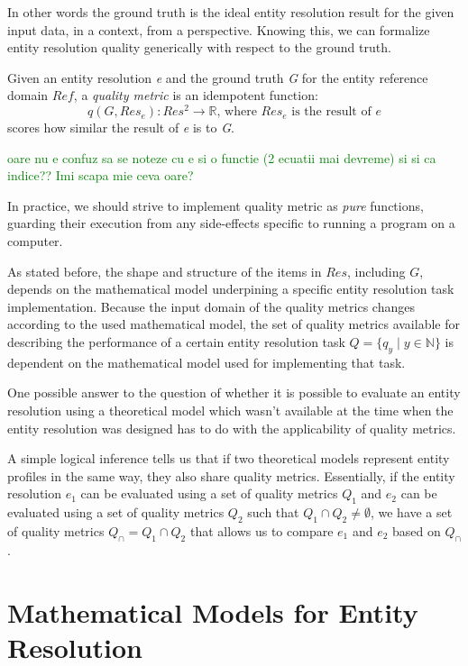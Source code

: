 \documentclass[journal]{IEEEtran}
\begin{document}
    In other words the ground truth is the ideal entity resolution result for 
    the given input data, in a context, from a perspective.
    Knowing this, we can formalize entity resolution quality generically with
    respect to the ground truth.
    
    \begin{defn}
    Given an entity resolution \textit{e} and the ground truth \textit{G} for
    the entity reference domain $Ref$, a \textit{quality metric} is an
    idempotent function:
    \[
        q(G, Res_e): Res^2 \rightarrow \mathbb{R}\textrm{, where
        }Res_e\textrm{ is the result of }e
    \]
    scores how similar the result of \textit{e} is to \textit{G}.
    \end{defn}
    \textcolor{green}{oare nu e confuz sa se noteze cu e si o functie (2 ecuatii mai devreme) si si ca indice?? Imi scapa mie ceva oare?}

    In practice, we should strive to implement quality metric as \textit{pure}
    functions, guarding their execution from any side-effects specific to
    running a program on a computer.

    As stated before, the shape and structure of the items in $Res$, including
    $G$, depends on the mathematical model underpining a specific entity
    resolution task implementation.
    Because the input domain of the quality metrics changes according to the
    used mathematical model, the set of quality metrics available for describing
    the performance of a certain entity resolution task $Q = \{q_y \mid y \in
    \mathbb{N}\}$ is dependent on the mathematical model used for implementing
    that task.

    One possible answer to the question of whether it is possible to evaluate
    an entity resolution using a theoretical model which wasn't available at the
    time when the entity resolution was designed has to do with the
    applicability of quality metrics.

    A simple logical inference tells us that if two theoretical models represent
    entity profiles in the same way, they also share quality metrics.
    Essentially, if the entity resolution $e_1$ can be evaluated using a set of
    quality metrics $Q_1$ and $e_2$ can be evaluated using a set of quality
    metrics $Q_2$ such that $Q_1 \cap Q_2 \neq \emptyset$, we have a set of
    quality metrics $Q_\cap = Q_1 \cap Q_2$ that allows us to compare $e_1$ and
    $e_2$ based on $Q_\cap$.
    
    \section[mm]{Mathematical Models for Entity Resolution}\label{sec:mm}
\end{document}
